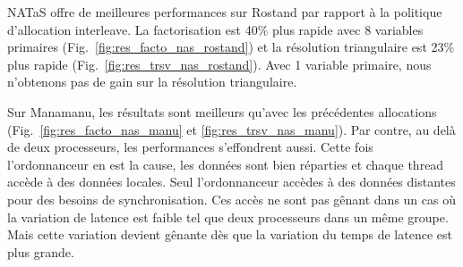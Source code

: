 NATaS offre de meilleures performances sur Rostand par rapport à la politique d'allocation interleave.
%
La factorisation est 40\% plus rapide avec 8 variables primaires (Fig.~\ref{fig:res_facto_nas_rostand}) et la résolution triangulaire est 23\% plus rapide (Fig.~\ref{fig:res_trsv_nas_rostand}).
%
Avec 1 variable primaire, nous n'obtenons pas de gain sur la résolution triangulaire.


Sur Manamanu, les résultats sont meilleurs qu'avec les précédentes allocations (Fig.~\ref{fig:res_facto_nas_manu} et \ref{fig:res_trsv_nas_manu}).
%
Par contre, au delà de deux processeurs, les performances s'effondrent aussi.
%
Cette fois l'ordonnanceur en est la cause, les données sont bien réparties et chaque thread accède à des données locales.
%
Seul l'ordonnanceur accèdes à des données distantes pour des besoins de synchronisation.
%
Ces accès ne sont pas gênant dans un cas où la variation de latence est faible tel que deux processeurs dans un même groupe.
%
Mais cette variation devient gênante dès que la variation du temps de latence est plus grande.
